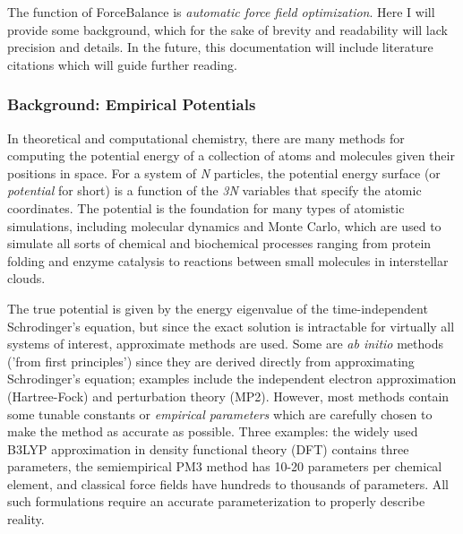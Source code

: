 The function of Force\-Balance is {\itshape automatic force field optimization}. Here I will provide some background, which for the sake of brevity and readability will lack precision and details. In the future, this documentation will include literature citations which will guide further reading.\hypertarget{index_background}{}\subsubsection{Background\-: Empirical Potentials}\label{index_background}
In theoretical and computational chemistry, there are many methods for computing the potential energy of a collection of atoms and molecules given their positions in space. For a system of {\itshape N} particles, the potential energy surface (or {\itshape potential} for short) is a function of the {\itshape 3\-N} variables that specify the atomic coordinates. The potential is the foundation for many types of atomistic simulations, including molecular dynamics and Monte Carlo, which are used to simulate all sorts of chemical and biochemical processes ranging from protein folding and enzyme catalysis to reactions between small molecules in interstellar clouds.

The true potential is given by the energy eigenvalue of the time-\/independent Schrodinger's equation, but since the exact solution is intractable for virtually all systems of interest, approximate methods are used. Some are {\itshape ab initio} methods ('from first principles') since they are derived directly from approximating Schrodinger's equation; examples include the independent electron approximation (Hartree-\/\-Fock) and perturbation theory (M\-P2). However, most methods contain some tunable constants or {\itshape empirical parameters} which are carefully chosen to make the method as accurate as possible. Three examples\-: the widely used B3\-L\-Y\-P approximation in density functional theory (D\-F\-T) contains three parameters, the semiempirical P\-M3 method has 10-\/20 parameters per chemical element, and classical force fields have hundreds to thousands of parameters. All such formulations require an accurate parameterization to properly describe reality.


